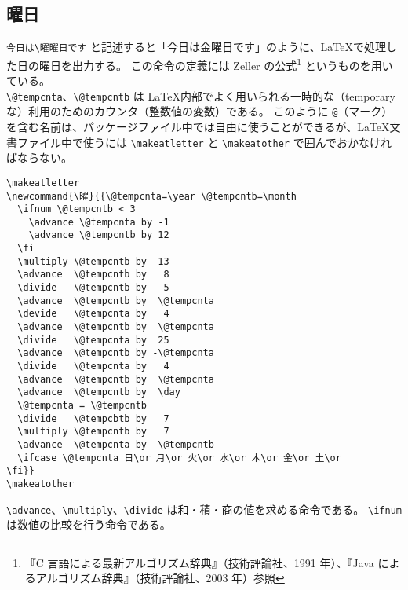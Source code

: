 \subsection{曜日}
\verb`今日は\曜`\textvisiblespace\verb`曜日です` と記述すると「今日は金曜日です」のように、\LaTeX{}で処理した日の曜日を出力する。\enlargethispage{+0.15zw}
この命令の定義には Zeller の公式\footnote{『C 言語による最新アルゴリズム辞典』（技術評論社、1991 年）、『Java によるアルゴリズム辞典』（技術評論社、2003 年）参照} というものを用いている。\\

\verb`\@tempcnta`、\verb`\@tempcntb` は \LaTeX{}内部でよく用いられる一時的な（temporary な）利用のためのカウンタ（整数値の変数）である。
このように \verb`@`（マーク）を含む名前は、パッケージファイル中では自由に使うことができるが、\LaTeX{}文書ファイル中で使うには \verb`\makeatletter` と \verb`\makeatother` で囲んでおかなければならない。
\begin{mdframed}[roundcorner=0.50zw,leftmargin=3.00zw,rightmargin=3.00zw,skipabove=0.40zw,skipbelow=0.40zw,innertopmargin=4.00pt,innerbottommargin=4.00pt,innerleftmargin=5.00pt,innerrightmargin=5.00pt,linecolor=gray!020,linewidth=0.50pt,backgroundcolor=gray!20]
\begin{verbatim}
\makeatletter
\newcommand{\曜}{{\@tempcnta=\year \@tempcntb=\month
  \ifnum \@tempcntb < 3
    \advance \@tempcnta by -1
    \advance \@tempcntb by 12
  \fi
  \multiply \@tempcntb by  13
  \advance  \@tempcntb by   8
  \divide   \@tempcntb by   5
  \advance  \@tempcntb by  \@tempcnta
  \devide   \@tempcnta by   4
  \advance  \@tempcntb by  \@tempcnta
  \divide   \@tempcnta by  25
  \advance  \@tempcntb by -\@tempcnta
  \divide   \@tempcnta by   4
  \advance  \@tempcntb by  \@tempcnta
  \advance  \@tempcntb by  \day
  \@tempcnta = \@tempcntb
  \divide   \@tempcbtb by   7
  \multiply \@tempcntb by   7
  \advance  \@tempcnta by -\@tempcntb
  \ifcase \@tempcnta 日\or 月\or 火\or 水\or 木\or 金\or 土\or
\fi}}
\makeatother
\end{verbatim}
\end{mdframed}
\verb`\advance`、\verb`\multiply`、\verb`\divide` は和・積・商の値を求める命令である。
\verb`\ifnum` は数値の比較を行う命令である。
